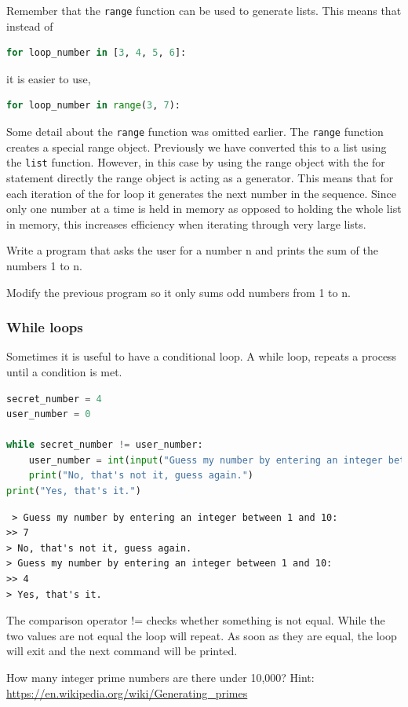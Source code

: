 Remember that the \texttt{range} function can be used to generate lists. This means that instead of 
\begin{lstlisting}[language=Python]
for loop_number in [3, 4, 5, 6]:
\end{lstlisting}
		it is easier to use,
\begin{lstlisting}[language=Python]
for loop_number in range(3, 7):
\end{lstlisting}
Some detail about the \texttt{range} function was omitted earlier. The \texttt{range} function creates a special range object. Previously we have converted this to a list using the \texttt{list} function. However, in this case by using the range object with the for statement directly the range object is acting as a generator. This means that for each iteration of the for loop it generates the next number in the sequence. Since only one number at a time is held in memory as opposed to holding the whole list in memory, this increases efficiency when iterating through very large lists.

		\begin{task}Write a program that asks the user for a number n and prints the sum of the numbers 1 to n.\end{task}
		\begin{task}Modify the previous program so it only sums odd numbers from 1 to n.\end{task}
		\subsubsection{While loops}
		Sometimes it is useful to have a conditional loop. A while loop, repeats a process until a condition is met.
\begin{lstlisting}[language=Python]
secret_number = 4
user_number = 0

while secret_number != user_number:
	user_number = int(input("Guess my number by entering an integer between 1 and 10: "
	print("No, that's not it, guess again.")
print("Yes, that's it.")\end{lstlisting}
		\begin{verbatim} > Guess my number by entering an integer between 1 and 10: 
>> 7
> No, that's not it, guess again.
> Guess my number by entering an integer between 1 and 10:
>> 4
> Yes, that's it.\end{verbatim}
		The comparison operator != checks whether something is not equal. While the two values are not equal the loop will repeat. As soon as they are equal, the loop will exit and the next command will be printed.
\begin{advancedtask}How many integer prime numbers are there under 10,000? Hint: \url{https://en.wikipedia.org/wiki/Generating_primes}\end{advancedtask}

